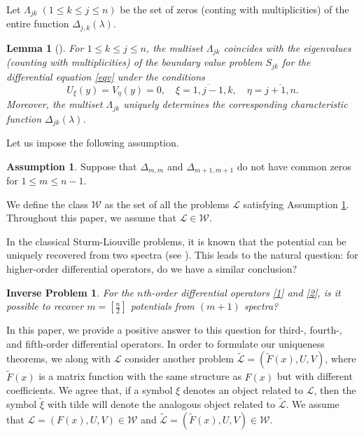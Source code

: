 \documentclass[reqno,12pt,centertags]{amsart}
\numberwithin{equation}{section}
\newtheorem{lemma}[theorem]{Lemma}
\newtheorem{ip}[theorem]{Inverse Problem}
\theoremstyle{definition}
\newtheorem{assume}[theorem]{Assumption}
\begin{document}
		Let $\Lambda_{jk}\;(1\leq k\leq j\leq n)$ be the set of zeros (conting with multiplicities) of the entire function $\Delta_{j,k}(\lambda)$.

\begin{lemma}[\cite{Yur,Bon2}]\label{S}
	For $1\leq k\leq j\leq n$, the multiset $\Lambda_{jk}$ coincides with the eigenvalues (counting with multiplicities) of the boundary value problem $S_{jk}$ for the differential equation \eqref{eqv} under the conditions
	$$
	U_{\xi}(y)=V_{\eta}(y)=0,\quad \xi=\overline{1,j-1},k,\quad\eta=\overline{j+1,n}.
	$$
	Moreover, the multiset $\Lambda_{jk}$ uniquely determines the corresponding characteristic function $\Delta_{jk}(\lambda)$.
\end{lemma}
	
	Let us impose the following assumption.
	
	\begin{assume} \label{def:G}
		Suppose that $\Delta_{m,m}$  and $\Delta_{m+1,m+1}$ do not have common zeros for $1 \leq m \leq n-1$.
	\end{assume}
	
	We define the class $\mathcal{W}$ as the set of all the problems $\mathcal L$ satisfying  Assumption \ref{def:G}. Throughout this paper, we assume that $\mathcal L \in \mathcal{W}$.
	
	In the classical Sturm-Liouville problems, it is known that the potential can be uniquely recovered from two spectra (see \cite{Bor}).
	This leads to the natural question: for higher-order differential operators, do we have a similar conclusion?
	
	\begin{ip} 
		For the $n$th-order differential operators \eqref{1} and \eqref{2}, is it possible to recover $m=[\frac{n}{2}]$ potentials from $(m+1)$ spectra?
	\end{ip}

In this paper, we provide a positive answer to this question for third-, fourth-, and fifth-order differential operators. In order to formulate our uniqueness theorems, we along with $\mathcal L$ consider another problem $\tilde{\mathcal{L}}=(\tilde{F}(x), {U}, {V})$, where $\tilde{F}(x)$ is a matrix function with the same structure as ${F}(x)$ but with different coefficients. We agree that, if a symbol $\xi$ denotes an object related to $\mathcal{L}$, then the symbol $\tilde{\xi}$ with tilde will denote the analogous object related to $\tilde{\mathcal{L}}$. We assume that $\mathcal{L}=(F(x),U , V)\in \mathcal{W}$ and $\tilde{\mathcal{L}}=(\tilde{F}(x), U ,V)\in \mathcal{W}$.
	
\end{document}
